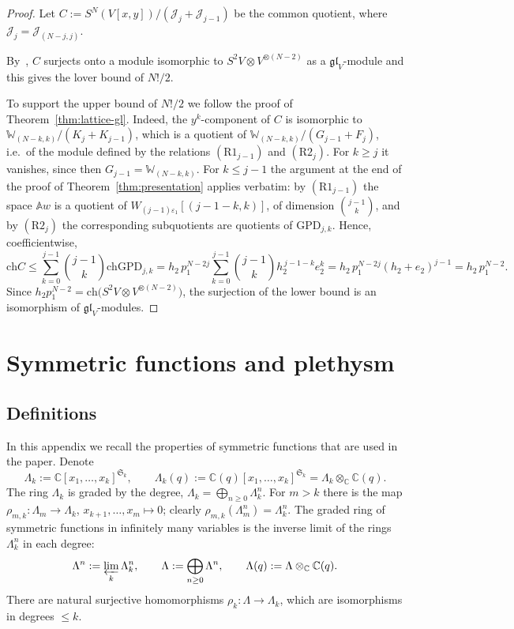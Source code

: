 \documentclass[11pt]{amsart}
\numberwithin{equation}{section}
\theoremstyle{definition}
\newcommand{\gl}{\mathfrak{gl}}
\newcommand{\bW}{\mathbb{W}}          %
\newcommand{\bA}{\mathbb{A}}          %
\newcommand{\GPD}{\mathrm{GPD}}         %
\newcommand{\eps}{\varepsilon}
\newcommand{\ch}{\mathrm{ch}}
\newcommand{\Lam}{\Lambda}
\newcommand{\cJ}{\mathcal{J}}
\begin{document}
	\begin{proof}
		Let $C:=S^N(V[x,y])/(\cJ_j+\cJ_{j-1})$ be the common quotient, where $\cJ_j=\cJ_{(N-j,j)}$.
		
		By~\cite[Theorem~B]{KM}, $C$ surjects onto a module isomorphic to $S^2V\otimes V^{\otimes(N-2)}$ as a $\gl_V$-module and this gives the lover bound of $N!/2$.
		
		To support the upper bound of $N!/2$ we follow the proof of Theorem~\ref{thm:lattice-gl}. Indeed, the $y^k$-component of $C$ is isomorphic to $\bW_{(N-k,k)}/(K_j+K_{j-1})$, which is a quotient of $\bW_{(N-k,k)}/(G_{j-1}+F_j)$, i.e.\ of the module defined by the relations $(\mathrm{R1}_{j-1})$ and $(\mathrm{R2}_j)$. For $k\ge j$ it vanishes, since then $G_{j-1}=\bW_{(N-k,k)}$. For $k\le j-1$ the argument at the end of the proof of Theorem~\ref{thm:presentation} applies verbatim: by $(\mathrm{R1}_{j-1})$ the space $\bA w$ is a quotient of $W_{(j-1)\eps_1}[(j-1-k,k)]$, of dimension $\binom{j-1}k$, and by $(\mathrm{R2}_j)$ the corresponding subquotients are quotients of $\GPD_{j,k}$. Hence, coefficientwise,
		\[
		\ch C\le\sum_{k=0}^{j-1}\binom{j-1}k\ch\GPD_{j,k}=h_2\,p_1^{N-2j}\sum_{k=0}^{j-1}\binom{j-1}kh_2^{\,j-1-k}e_2^k=h_2\,p_1^{N-2j}(h_2+e_2)^{j-1}=h_2\,p_1^{N-2}.
		\]
		Since $h_2p_1^{N-2}=\ch\big(S^2V\otimes V^{\otimes(N-2)}\big)$, the surjection of the lower bound is an isomorphism of $\gl_V$-modules.
	\end{proof}
	
	\appendix
	
	\section{Symmetric functions and plethysm}\label{app:symm}
	
	\subsection{Definitions}\label{ssec:symm-def}
	In this appendix we recall the properties of symmetric functions that are used in the paper. Denote
	\[
	\Lam_k:=\mathbb{C}[x_1,\dots,x_k]^{\mathfrak S_k},\qquad \Lam_k(q):=\mathbb{C}(q)[x_1,\dots,x_k]^{\mathfrak S_k}=\Lam_k\otimes_{\mathbb{C}}\mathbb{C}(q).
	\]
	The ring $\Lam_k$ is graded by the degree, $\Lam_k=\bigoplus_{n\ge0}\Lam_k^n$. For $m>k$ there is the map $\rho_{m,k}\colon\Lam_m\to\Lam_k$, $x_{k+1},\dots,x_m\mapsto0$; clearly $\rho_{m,k}(\Lam_m^n)=\Lam_k^n$. The graded ring of symmetric functions in infinitely many variables is the inverse limit of the rings $\Lam_k^n$ in each degree:
	\[
	\Lam^n:=\varprojlim_k\Lam_k^n,\qquad\Lam:=\bigoplus_{n\ge0}\Lam^n,\qquad \Lam(q):=\Lam\otimes_\mathbb{C}\mathbb{C}(q).
	\]
	There are natural surjective homomorphisms $\rho_k\colon\Lam\to\Lam_k$, which are isomorphisms in degrees $\le k$.
	
\end{document}
